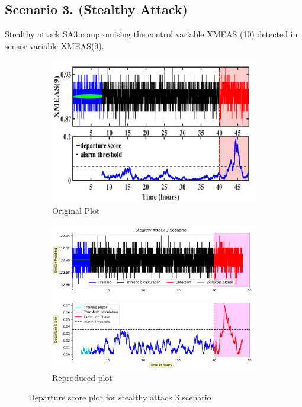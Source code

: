 \subsection*{Scenario 3. (Stealthy Attack)}

Stealthy attack SA3 compromising the control variable XMEAS (10) detected in sensor variable XMEAS(9).

\begin{figure}[H]	
	\centering
	\begin{subfigure}[t]{0.45\textwidth}
		\centering
		\includegraphics[width=\textwidth]{imgs/sa3orig.png}
		\caption{Original Plot}\label{fig:1a}		
	\end{subfigure}
	\qquad
	\begin{subfigure}[t]{0.45\textwidth}
		\centering
		\includegraphics[width=\textwidth]{imgs/sa3re.png}
		\caption{Reproduced plot}\label{fig:1b}
	\end{subfigure}
	\caption{Departure score plot for stealthy attack 3 scenario}\label{fig:1}
\end{figure}

